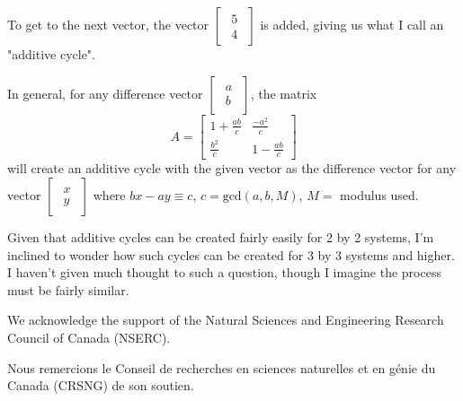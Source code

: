 \documentclass[a4paper, 12pt, reqno]{amsart}
\begin{document}
			To get to the next vector, the vector 
			$
				\begin{bmatrix}
					\begin{smallmatrix}
						5 \\
						4
					\end{smallmatrix}
				\end{bmatrix}
			$
			is added, giving us what I call an "additive cycle".
			
			In general, for any difference vector
			$
				\begin{bmatrix}
					\begin{smallmatrix}
						a \\
						b
					\end{smallmatrix}
				\end{bmatrix}
			$,
			the matrix
			\[
				A = 
				\begin{bmatrix}
					1 + \frac{ab}{c} & \frac{-a^2}{c} \\
					\frac{b^2}{c}    & 1 - \frac{ab}{c}
				\end{bmatrix}
			\]
			will create an additive cycle with the given vector as the difference vector for any vector
			$
				\begin{bmatrix}
					\begin{smallmatrix}
						x \\
						y
					\end{smallmatrix}
				\end{bmatrix}
			$
			where $bx - ay \equiv c$, $c = \text{gcd}(a, b, M)$, $M = $ modulus used.
			
			Given that additive cycles can be created fairly easily for 2 by 2 systems, I'm inclined to wonder how
			such cycles can be created for 3 by 3 systems and higher. I haven't given much thought to such a question,
			though I imagine the process must be fairly similar.
		
	
	
	
	\newpage
	We acknowledge the support of the Natural Sciences and Engineering Research Council of Canada (NSERC).

	Nous remercions le Conseil de recherches en sciences naturelles et en génie du Canada (CRSNG) de son soutien.
	
\end{document}

